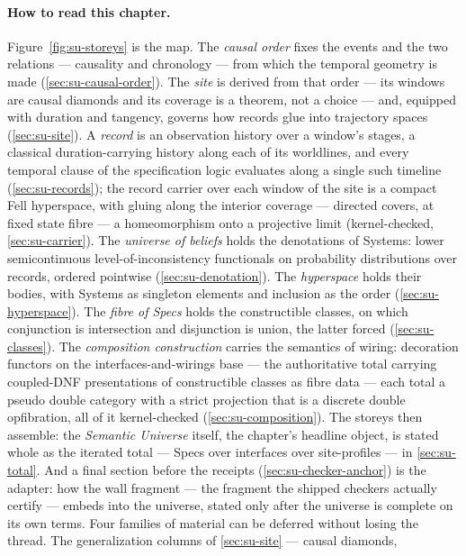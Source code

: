 \paragraph{How to read this chapter.} Figure~\ref{fig:su-storeys} is the map. The
\emph{causal order} fixes the events and the two relations --- causality and
chronology --- from which the temporal geometry is made
(\autoref{sec:su-causal-order}). The \emph{site} is derived from that order ---
its windows are causal diamonds and its coverage is a theorem, not a choice ---
and, equipped with duration and tangency, governs how records glue into
trajectory spaces (\autoref{sec:su-site}). A \emph{record} is an observation
history over a window's stages, a classical duration-carrying history along
each of its worldlines, and every temporal clause of the specification logic
evaluates along a single such timeline (\autoref{sec:su-records}); the record
carrier over each window of the site is a compact Fell hyperspace, with gluing
along the interior coverage --- directed covers, at fixed state fibre --- a
homeomorphism onto a projective limit (kernel-checked,
\autoref{sec:su-carrier}). The \emph{universe of beliefs} holds the
denotations of Systems: lower semicontinuous level-of-inconsistency
functionals on probability distributions over records, ordered pointwise
(\autoref{sec:su-denotation}).
The \emph{hyperspace} holds their bodies, with Systems as singleton elements
and inclusion as the order (\autoref{sec:su-hyperspace}). The \emph{fibre of
Specs} holds the constructible classes, on which conjunction is intersection
and disjunction is union, the latter forced (\autoref{sec:su-classes}). The
\emph{composition construction} carries the semantics of wiring: decoration
functors on the interfaces-and-wirings base --- the authoritative total
carrying coupled-DNF presentations of constructible classes as fibre data ---
each total a pseudo double category with a strict projection that is a discrete
double opfibration, all of it kernel-checked (\autoref{sec:su-composition}).
The storeys then assemble: the \emph{Semantic Universe} itself, the chapter's
headline object, is stated whole as the iterated total --- Specs over
interfaces over site-profiles --- in \autoref{sec:su-total}. And a final
section before the receipts (\autoref{sec:su-checker-anchor}) is the adapter:
how the wall fragment --- the fragment the shipped checkers actually certify
--- embeds into the universe, stated only after the universe is complete on its
own terms. Four families of material can be deferred without losing the thread.
The generalization columns of \autoref{sec:su-site} --- causal diamonds,

